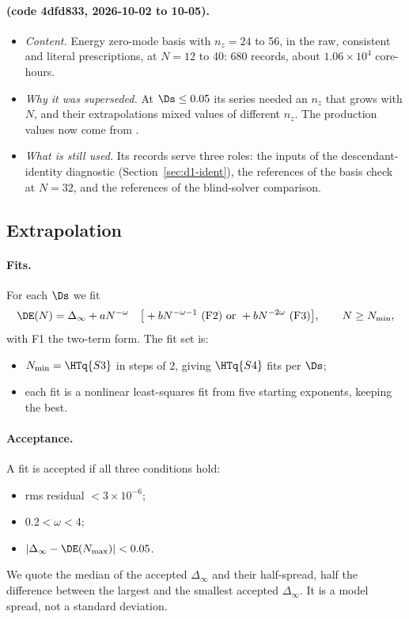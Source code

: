 \paragraph{ (code 4dfd833, 2026-10-02 to 10-05).}
\begin{itemize}
\item \emph{Content.} Energy zero-mode basis with $n_z=24$ to 56, in the raw, consistent and literal prescriptions,
 at $N=12$ to 40: 680 records, about $1.06\times10^4$ core-hours.
\item \emph{Why it was superseded.} At $\Ds\le0.05$ its series needed an $n_z$ that grows with $N$, and their
 extrapolations mixed values of different $n_z$. The production values now come from .
\item \emph{What is still used.} Its records serve three roles: the inputs of the descendant-identity diagnostic
 (Section~\ref{sec:d1-ident}), the references of the basis check at $N=32$, and the references of the blind-solver
 comparison.
\end{itemize}

\subsection{Extrapolation}\label{sec:d1-extrap}
\paragraph{Fits.} For each $\Ds$ we fit
\begin{equation}
 \DE(N)=\Delta_\infty+aN^{-\omega}\quad\big[{}+bN^{-\omega-1}\ \text{(F2) or }{}+bN^{-2\omega}\ \text{(F3)}\big],\qquad N\ge N_{\min},
 \label{eq:fitN}
\end{equation}
with F1 the two-term form. The fit set is:
\begin{itemize}
\item $N_{\min}=\HTq{S3}$ in steps of 2, giving $\HTq{S4}$ fits per $\Ds$;
\item each fit is a nonlinear least-squares fit from five starting exponents, keeping the best.
\end{itemize}

\paragraph{Acceptance.} A fit is accepted if all three conditions hold:
\begin{itemize}
\item rms residual $<3\times10^{-6}$;
\item $0.2<\omega<4$;
\item $|\Delta_\infty-\DE(N_{\max})|<0.05$.
\end{itemize}
We quote the median of the accepted $\Delta_\infty$ and their half-spread, half the difference between the largest
and the smallest accepted $\Delta_\infty$. It is a model spread, not a standard deviation.

